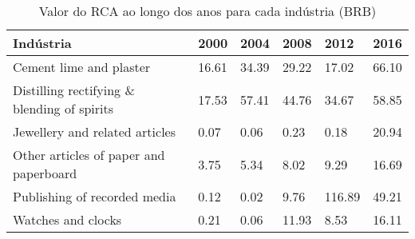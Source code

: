 \begin{table}
\centering
\caption{Valor do RCA ao longo dos anos para cada indústria (BRB)}
\label{tab:ex3-tempo-BRB}
\begin{tabular}{p{6cm}p{1.5cm}p{1.5cm}p{1.5cm}p{1.5cm}p{1.5cm}}
\toprule
                                  Indústria &  2000 &  2004 &  2008 &   2012 &  2016 \\
\midrule
                    Cement lime and plaster & 16.61 & 34.39 & 29.22 &  17.02 & 66.10 \\
Distilling rectifying \& blending of spirits & 17.53 & 57.41 & 44.76 &  34.67 & 58.85 \\
             Jewellery and related articles &  0.07 &  0.06 &  0.23 &   0.18 & 20.94 \\
     Other articles of paper and paperboard &  3.75 &  5.34 &  8.02 &   9.29 & 16.69 \\
               Publishing of recorded media &  0.12 &  0.02 &  9.76 & 116.89 & 49.21 \\
                         Watches and clocks &  0.21 &  0.06 & 11.93 &   8.53 & 16.11 \\
\bottomrule
\end{tabular}
\end{table}
